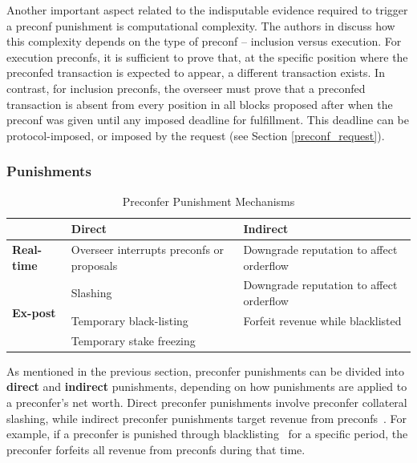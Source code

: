 \documentclass[a4paper]{article}
\theoremstyle{boldstyle}
\begin{document}
    Another important aspect related to the indisputable evidence required to trigger a preconf punishment is computational complexity. The authors in \cite{W:ATaxonomyofPreconfirmationGuaranteesandTheirSlashingConditionsinRollups} discuss how this complexity depends on the type of preconf -- inclusion versus execution. For execution preconfs, it is sufficient to prove that, at the specific position where the preconfed transaction is expected to appear, a different transaction exists. In contrast, for inclusion preconfs, the overseer must prove that a preconfed transaction is absent from every position in all blocks proposed after when the preconf was given until any imposed deadline for fulfillment. This deadline can be protocol-imposed, or imposed by the request (see Section \ref{preconf_request}).

    \subsubsection{Punishments} \label{punishments}

    
\begin{table}[h]
    \renewcommand{\arraystretch}{1.5} %
    \centering
    \begin{tabularx}{\textwidth}{| l | X | X |}
        \hline
        & \textbf{Direct} & \textbf{Indirect} \\
        \hline
        \textbf{Real-time} & Overseer interrupts preconfs or proposals & Downgrade reputation to affect orderflow \\
        \hline
        \multirow{3}{*}{\textbf{Ex-post}} 
        & Slashing & Downgrade reputation to affect orderflow \\
        \cline{2-3}
        & Temporary black-listing & Forfeit revenue while blacklisted \\
        \cline{2-3} 
        & Temporary stake freezing & \\
        \hline
    \end{tabularx}
    \caption{Preconfer Punishment Mechanisms}
    \label{tab:punishments}
\end{table}

    
    As mentioned in the previous section, preconfer punishments can be divided into \textbf{direct} and \textbf{indirect} punishments, depending on how punishments are applied to a preconfer's net worth. Direct preconfer punishments involve preconfer collateral slashing, while indirect preconfer punishments target revenue from preconfs~\cite{W:PreconfirmationFairExchange}. For example, if a preconfer is punished through blacklisting~\cite{W:PreconfirmationFairExchange} for a specific period, the preconfer forfeits all revenue from preconfs during that time.
    
\end{document}
